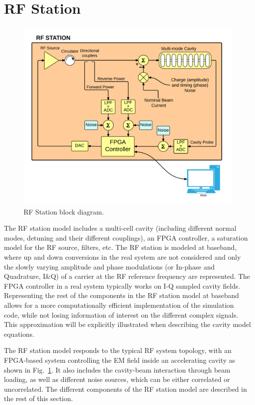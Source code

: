 \documentclass[a4paper,12pt]{article}
\begin{document}
\newpage

\section{RF Station}
\label{sec:rf_station}

\begin{figure}
\centering
\includegraphics[scale=0.75]{../figures/Station_rf_blocks.png}
\caption{RF Station block diagram.}
\label{fig:Station_block_diagram}
\end{figure}

The RF station model includes a multi-cell cavity (including different normal modes, detuning and their different couplings), an FPGA controller, a saturation model for the RF source, filters, etc. The RF station is modeled at baseband, where up and down conversions in the real system are not considered and only the slowly varying amplitude and phase modulations (or In-phase and Quadrature, I\&Q) of a carrier at the RF reference frequency are represented. The FPGA controller in a real system typically works on I-Q sampled cavity fields. Representing the rest of the components in the RF station model at baseband allows for a more computationally efficient implementation of the simulation code, while not losing information of interest on the different complex signals. This approximation will be explicitly illustrated when describing the cavity model equations.

The RF station model responds to the typical RF system topology, with an FPGA-based system controlling the EM field inside an accelerating cavity as shown in Fig.~\ref{fig:Station_block_diagram}. It also includes the cavity-beam interaction through beam loading, as well as different noise sources, which can be either correlated or uncorrelated. The different components of the RF station model are described in the rest of this section.
\end{document}
